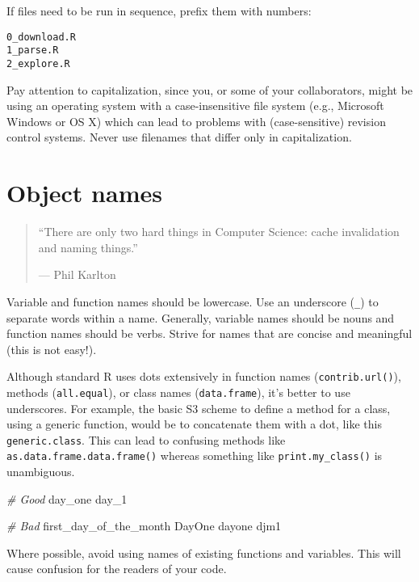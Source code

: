 \documentclass[]{book}
\newenvironment{Shaded}{\begin{snugshade}}{\end{snugshade}}
\newcommand{\CommentTok}[1]{\textcolor[rgb]{0.56,0.35,0.01}{\textit{{#1}}}}
\newcommand{\NormalTok}[1]{{#1}}
\begin{document}
If files need to be run in sequence, prefix them with numbers:

\begin{verbatim}
0_download.R
1_parse.R
2_explore.R
\end{verbatim}

Pay attention to capitalization, since you, or some of your
collaborators, might be using an operating system with a
case-insensitive file system (e.g., Microsoft Windows or OS X) which can
lead to problems with (case-sensitive) revision control systems. Never
use filenames that differ only in capitalization.

\section{Object names}\label{object-names}

\begin{quote}
``There are only two hard things in Computer Science: cache invalidation
and naming things.''

--- Phil Karlton
\end{quote}

Variable and function names should be lowercase. Use an underscore
(\texttt{\_}) to separate words within a name. Generally, variable names
should be nouns and function names should be verbs. Strive for names
that are concise and meaningful (this is not easy!).

Although standard R uses dots extensively in function names
(\texttt{contrib.url()}), methods (\texttt{all.equal}), or class names
(\texttt{data.frame}), it's better to use underscores. For example, the
basic S3 scheme to define a method for a class, using a generic
function, would be to concatenate them with a dot, like this
\texttt{generic.class}. This can lead to confusing methods like
\texttt{as.data.frame.data.frame()} whereas something like
\texttt{print.my\_class()} is unambiguous.

\begin{Shaded}
\begin{Highlighting}[]
\CommentTok{# Good}
\NormalTok{day_one}
\NormalTok{day_1}

\CommentTok{# Bad}
\NormalTok{first_day_of_the_month}
\NormalTok{DayOne}
\NormalTok{dayone}
\NormalTok{djm1}
\end{Highlighting}
\end{Shaded}

Where possible, avoid using names of existing functions and variables.
This will cause confusion for the readers of your code.
\end{document}
